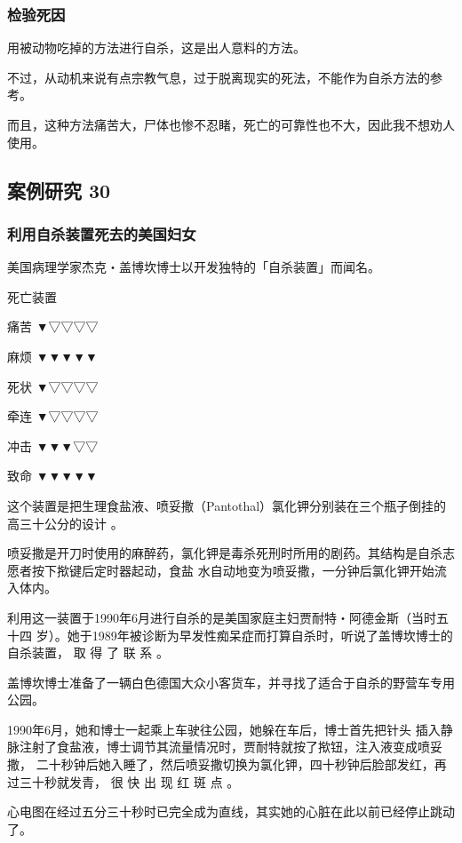 \documentclass[UTF8]{ctexart}
\begin{document}
\subsubsection*{检验死因}

用被动物吃掉的方法进行自杀，这是出人意料的方法。

不过，从动机来说有点宗教气息，过于脱离现实的死法，不能作为自杀方法的参考。

而且，这种方法痛苦大，尸体也惨不忍睹，死亡的可靠性也不大，因此我不想劝人使用。



\subsection{案例研究 30}

\subsubsection*{利用自杀装置死去的美国妇女}

美国病理学家杰克‧盖博坎博士以开发独特的「自杀装置」而闻名。

死亡装置

痛苦 ▼▽▽▽▽

麻烦 ▼▼▼▼▼

死状 ▼▽▽▽▽

牵连 ▼▽▽▽▽

冲击 ▼▼▼▽▽

致命 ▼▼▼▼▼

这个装置是把生理食盐液、喷妥撒（Pantothal）氯化钾分别装在三个瓶子倒挂的高三十公分的设计 。

喷妥撒是开刀时使用的麻醉药，氯化钾是毒杀死刑时所用的剧药。其结构是自杀志愿者按下揿键后定时器起动，食盐 水自动地变为喷妥撒，一分钟后氯化钾开始流入体内。

利用这一装置于1990年6月进行自杀的是美国家庭主妇贾耐特‧阿德金斯（当时五十四 岁）。她于1989年被诊断为早发性痴呆症而打算自杀时，听说了盖博坎博士的自杀装置， 取 得 了 联 系 。

盖博坎博士准备了一辆白色德国大众小客货车，并寻找了适合于自杀的野营车专用公园。

1990年6月，她和博士一起乘上车驶往公园，她躲在车后，博士首先把针头 插入静脉注射了食盐液，博士调节其流量情况时，贾耐特就按了揿钮，注入液变成喷妥撒， 二十秒钟后她入睡了，然后喷妥撒切换为氯化钾，四十秒钟后脸部发红，再过三十秒就发青， 很 快 出 现 红 斑 点 。

心电图在经过五分三十秒时已完全成为直线，其实她的心脏在此以前已经停止跳动了。
\end{document}
